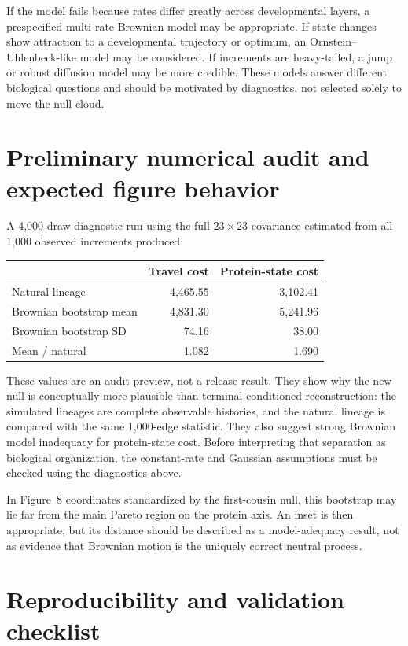 \documentclass[10pt]{article}
\begin{document}
If the model fails because rates differ greatly across developmental layers,
a prespecified multi-rate Brownian model may be appropriate.  If state changes
show attraction to a developmental trajectory or optimum, an
Ornstein--Uhlenbeck-like model may be considered.  If increments are
heavy-tailed, a jump or robust diffusion model may be more credible.  These
models answer different biological questions and should be motivated by
diagnostics, not selected solely to move the null cloud.

\section{Preliminary numerical audit and expected figure behavior}

A 4,000-draw diagnostic run using the full $23\times23$ covariance estimated
from all 1,000 observed increments produced:

\begin{center}
\begin{tabular}{lrr}
\toprule
 & Travel cost & Protein-state cost \\
\midrule
Natural lineage & 4,465.55 & 3,102.41 \\
Brownian bootstrap mean & 4,831.30 & 5,241.96 \\
Brownian bootstrap SD & 74.16 & 38.00 \\
Mean / natural & 1.082 & 1.690 \\
\bottomrule
\end{tabular}
\end{center}

These values are an audit preview, not a release result.  They show why the new
null is conceptually more plausible than terminal-conditioned reconstruction:
the simulated lineages are complete observable histories, and the natural
lineage is compared with the same 1,000-edge statistic.  They also suggest
strong Brownian model inadequacy for protein-state cost.  Before interpreting
that separation as biological organization, the constant-rate and Gaussian
assumptions must be checked using the diagnostics above.

In Figure~8 coordinates standardized by the first-cousin null, this bootstrap
may lie far from the main Pareto region on the protein axis.  An inset is then
appropriate, but its distance should be described as a model-adequacy result,
not as evidence that Brownian motion is the uniquely correct neutral process.

\newpage
\section{Reproducibility and validation checklist}
\end{document}

